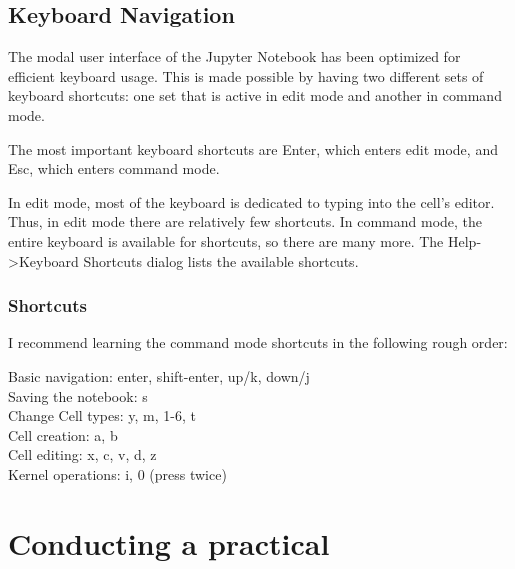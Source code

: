 \section{Keyboard Navigation}
The modal user interface of the Jupyter Notebook has been optimized for efficient keyboard usage. This is made possible by having two different sets of keyboard shortcuts: one set that is active in edit mode and another in command mode.

The most important keyboard shortcuts are Enter, which enters edit mode, and Esc, which enters command mode.

In edit mode, most of the keyboard is dedicated to typing into the cell's editor. Thus, in edit mode there are relatively few shortcuts. In command mode, the entire keyboard is available for shortcuts, so there are many more. The Help->Keyboard Shortcuts dialog lists the available shortcuts.
\subsection{Shortcuts}
I recommend learning the command mode shortcuts in the following rough order:

Basic navigation: enter, shift-enter, up/k, down/j\\
Saving the notebook: s\\
Change Cell types: y, m, 1-6, t\\
Cell creation: a, b\\
Cell editing: x, c, v, d, z\\
Kernel operations: i, 0 (press twice)\\

\chapter{Conducting a practical}

